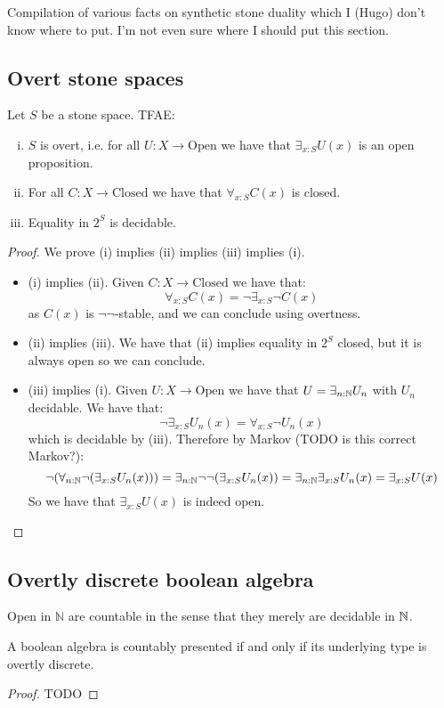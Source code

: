Compilation of various facts on synthetic stone duality which I (Hugo) don't know where to put. I'm not even sure where I should put this section.

\subsection{Overt stone spaces}

\begin{proposition}
Let $S$ be a stone space. TFAE:
\begin{enumerate}[(i)]
\item $S$ is overt, i.e. for all $U:X\to \mathrm{Open}$ we have that $\exists_{x:S} U(x)$ is an open proposition.
\item For all $C:X\to \mathrm{Closed}$ we have that $\forall_{x:S} C(x)$ is closed.
\item Equality in $2^S$ is decidable.
\end{enumerate}
\end{proposition}

\begin{proof}
We prove (i) implies (ii) implies (iii) implies (i).
\begin{itemize}
\item (i) implies (ii). Given $C:X\to \mathrm{Closed}$ we have that:
\[\forall_{x:S} C(x) = \neg \exists_{x:S} \neg C(x)\]
as $C(x)$ is $\neg\neg$-stable, and we can conclude using overtness.
\item (ii) implies (iii). We have that (ii) implies equality in $2^S$ closed, but it is always open so we can conclude.
\item (iii) implies (i). Given $U:X\to \mathrm{Open}$ we have that $U = \exists_{n:\mathbb{N}} U_n$ with $U_n$ decidable. We have that:
\[\neg \exists_{x:S} U_n(x) = \forall_{x:S} \neg U_n(x)\]
which is decidable by (iii). Therefore by Markov (TODO is this correct Markov?):
\[\neg(\forall_{n:\mathbb{N}} \neg (\exists_{x:S} U_n(x))) =  \exists_{n:\mathbb{N}} \neg\neg (\exists_{x:S} U_n(x)) =  \exists_{n:\mathbb{N}} \exists_{x:S} U_n(x) = \exists_{x:S}U(x)\]
So we have that $\exists_{x:S}U(x)$ is indeed open.
\end{itemize}
\end{proof}


\subsection{Overtly discrete boolean algebra}

\begin{remark}
Open in $\mathbb{N}$ are countable in the sense that they merely are decidable in $\mathbb{N}$.
\end{remark}

\begin{proposition}
A boolean algebra is countably presented if and only if its underlying type is overtly discrete.
\end{proposition}

\begin{proof}
TODO
\end{proof}